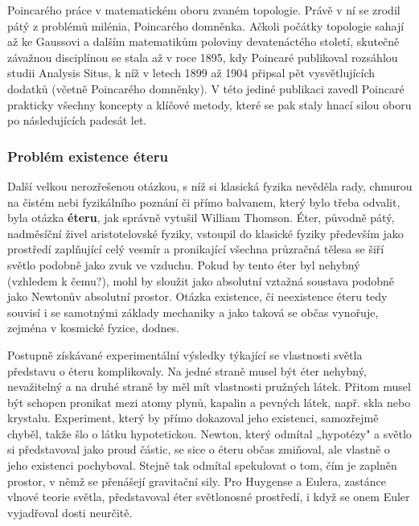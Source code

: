 \begin{tcnote}
        Poincarého práce v matematickém oboru zvaném topologie. Právě v ní se zrodil pátý z problémů
        milénia, Poincarého domněnka. Ačkoli počátky topologie sahají až ke Gaussovi a dalším
        matematikům poloviny devatenáctého století, skutečně závažnou disciplínou se stala až v roce
        1895, kdy Poincaré publikoval rozsáhlou studii Analysis Situs, k níž v letech 1899 až 1904
        připsal pět vysvětlujících dodatků (včetně Poincarého domněnky). V této jediné publikaci
        zavedl Poincaré prakticky všechny koncepty a klíčové metody, které se pak staly hnací silou
        oboru po následujících padesát let.
      \end{tcnote}

      \subsubsection{Problém existence éteru}
        Další velkou nerozřešenou otázkou, s níž si klasická fyzika nevěděla rady, chmurou na čistém
        nebi fyzikálního poznání či přímo balvanem, který bylo třeba odvalit, byla otázka
        \textbf{éteru}, jak správně vytušil William Thomson. Éter, původně pátý, nadměsíční živel
        aristotelovské fyziky, vstoupil do klasické fyziky především jako prostředí zaplňující celý
        vesmír a pronikající všechna průzračná tělesa se šiří světlo podobně jako zvuk ve vzduchu.
        Pokud by tento éter byl nehybný (vzhledem k čemu?), mohl by sloužit jako absolutní vztažná
        soustava podobně jako Newtonův absolutní prostor. Otázka existence, či neexistence éteru
        tedy souvisí i se samotnými základy mechaniky a jako taková se občas vynořuje, zejména v
        kosmické fyzice, dodnes.

        Postupně získávané experimentální výsledky týkající se vlastnosti světla představu o éteru
        komplikovaly. Na jedné straně musel být éter nehybný, nevažitelný a na druhé straně by měl
        mít vlastnosti pružných látek. Přitom musel být schopen pronikat mezi atomy plynů, kapalin a
        pevných látek, např. skla nebo krystalu. Experiment, který by přímo dokazoval jeho
        existenci, samozřejmě chyběl, takže šlo o látku hypotetickou. Newton, který odmítal
        „hypotézy" a světlo si představoval jako proud částic, se sice o éteru občas zmiňoval, ale
        vlastně o jeho existenci pochyboval. Stejně tak odmítal spekulovat o tom, čím je zaplněn
        prostor, v němž se přenášejí gravitační sily. Pro Huygense a Eulera, zastánce vlnové teorie
        světla, představoval éter světlonosné prostředí, i když se onem Euler vyjadřoval dosti
        neurčitě. 

